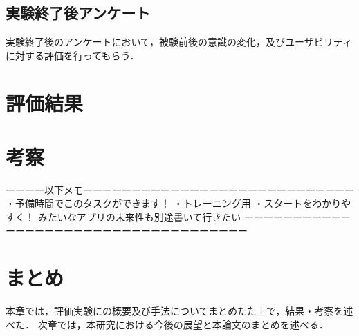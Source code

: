\subsection{実験終了後アンケート}
実験終了後のアンケートにおいて，被験前後の意識の変化，及びユーザビリティに対する評価を行ってもらう．%
\section{評価結果}
\section{考察}
ーーーー以下メモーーーーーーーーーーーーーーーーーーーーーーーーーーーー
・予備時間でこのタスクができます！
・トレーニング用
・スタートをわかりやすく！ みたいなアプリの未来性も別途書いて行きたい
ーーーーーーーーーーーーーーーーーーーーーーーーーーーーーーーーーーーー

\section{まとめ}
本章では，評価実験にの概要及び手法についてまとめたた上で，結果・考察を述べた．
次章では，本研究における今後の展望と本論文のまとめを述べる．
